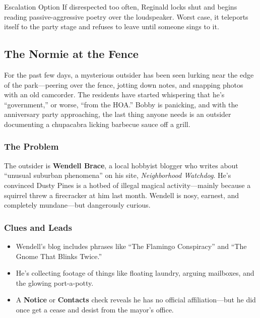 \begin{CommentBox}{Escalation Option}
    If disrespected too often, Reginald locks shut and begins reading passive-aggressive poetry over the loudspeaker. Worst case, it teleports itself to the party stage and refuses to leave until someone sings to it.
\end{CommentBox}



\subsection{The Normie at the Fence}

For the past few days, a mysterious outsider has been seen lurking near the edge of the park—peering over the fence, jotting down notes, and snapping photos with an old camcorder. The residents have started whispering that he’s “government,” or worse, “from the HOA.” Bobby is panicking, and with the anniversary party approaching, the last thing anyone needs is an outsider documenting a chupacabra licking barbecue sauce off a grill.

\subsubsection{The Problem}
The outsider is \textbf{Wendell Brace}, a local hobbyist blogger who writes about “unusual suburban phenomena” on his site, \emph{Neighborhood Watchdog}. He’s convinced Dusty Pines is a hotbed of illegal magical activity—mainly because a squirrel threw a firecracker at him last month. Wendell is nosy, earnest, and completely mundane—but dangerously curious.



\subsubsection{Clues and Leads}
\begin{itemize}\raggedright
    \item Wendell’s blog includes phrases like “The Flamingo Conspiracy” and “The Gnome That Blinks Twice.”
    \item He’s collecting footage of things like floating laundry, arguing mailboxes, and the glowing port-a-potty.
    \item A \textbf{Notice}  or \textbf{Contacts}  check reveals he has no official affiliation—but he did once get a cease and desist from the mayor’s office.
\end{itemize}

